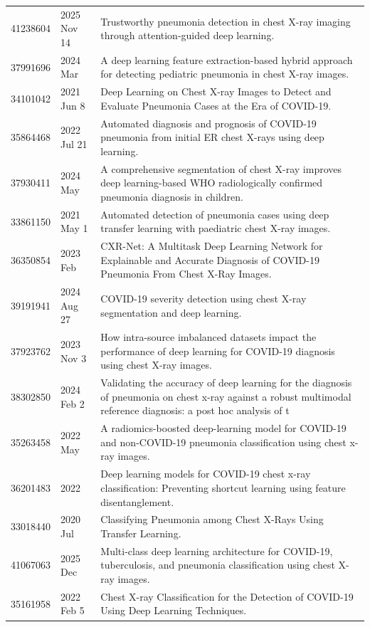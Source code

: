 \begin{longtable}{llp{9.5cm}}
41238604 & 2025 Nov 14 & Trustworthy pneumonia detection in chest X-ray imaging through attention-guided deep learning. \\
37991696 & 2024 Mar & A deep learning feature extraction-based hybrid approach for detecting pediatric pneumonia in chest X-ray images. \\
34101042 & 2021 Jun 8 & Deep Learning on Chest X-ray Images to Detect and Evaluate Pneumonia Cases at the Era of COVID-19. \\
35864468 & 2022 Jul 21 & Automated diagnosis and prognosis of COVID-19 pneumonia from initial ER chest X-rays using deep learning. \\
37930411 & 2024 May & A comprehensive segmentation of chest X-ray improves deep learning-based WHO radiologically confirmed pneumonia diagnosis in children. \\
33861150 & 2021 May 1 & Automated detection of pneumonia cases using deep transfer learning with paediatric chest X-ray images. \\
36350854 & 2023 Feb & CXR-Net: A Multitask Deep Learning Network for Explainable and Accurate Diagnosis of COVID-19 Pneumonia From Chest X-Ray Images. \\
39191941 & 2024 Aug 27 & COVID-19 severity detection using chest X-ray segmentation and deep learning. \\
37923762 & 2023 Nov 3 & How intra-source imbalanced datasets impact the performance of deep learning for COVID-19 diagnosis using chest X-ray images. \\
38302850 & 2024 Feb 2 & Validating the accuracy of deep learning for the diagnosis of pneumonia on chest x-ray against a robust multimodal reference diagnosis: a post hoc analysis of t \\
35263458 & 2022 May & A radiomics-boosted deep-learning model for COVID-19 and non-COVID-19 pneumonia classification using chest x-ray images. \\
36201483 & 2022 & Deep learning models for COVID-19 chest x-ray classification: Preventing shortcut learning using feature disentanglement. \\
33018440 & 2020 Jul & Classifying Pneumonia among Chest X-Rays Using Transfer Learning. \\
41067063 & 2025 Dec & Multi-class deep learning architecture for COVID-19, tuberculosis, and pneumonia classification using chest X-ray images. \\
35161958 & 2022 Feb 5 & Chest X-ray Classification for the Detection of COVID-19 Using Deep Learning Techniques. \\

\end{longtable}
